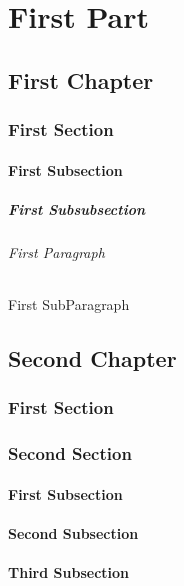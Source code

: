 ﻿\documentclass{book}
\begin{document}
\part{First Part}
\chapter{First Chapter}
\section{First Section}
\subsection{First Subsection}
\subsubsection{First Subsubsection}
\paragraph{First Paragraph}
\subparagraph{First SubParagraph}
\chapter{Second Chapter}
\section{First Section}
\section{Second Section}
\subsection{First Subsection}
\subsection{Second Subsection}
\subsection{Third Subsection}
\end{document}
